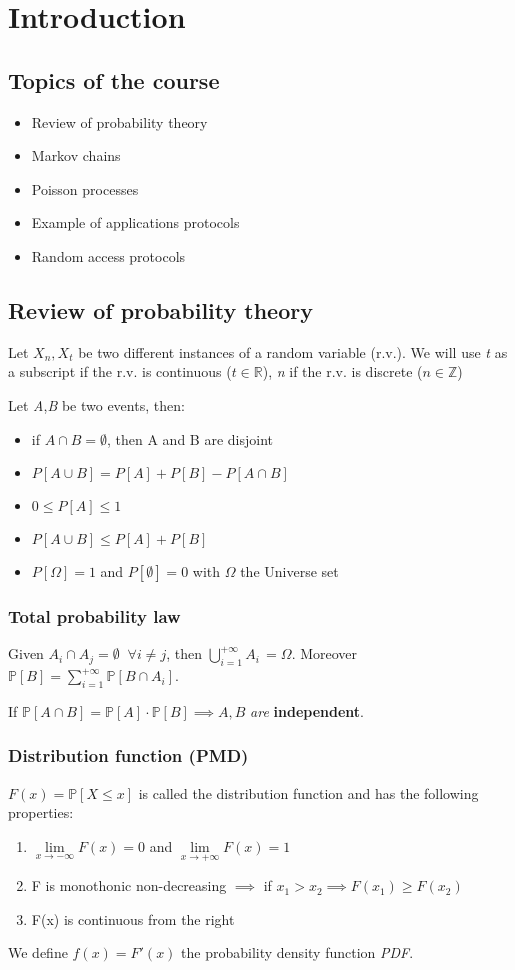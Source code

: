 \chapter{Introduction}
\section{Topics of the course}
\begin{itemize}
  \item Review of probability theory
  \item Markov chains
  \item Poisson processes
  \item Example of applications protocols
  \item Random access protocols
\end{itemize}
\section{Review of probability theory}
Let $X_n, X_t$ be two different instances of a random variable (r.v.). We will use
\textit{t} as a subscript if the r.v. is continuous ($t \in \mathbb{R}$), \textit{n} if the r.v. is discrete ($ n \in \mathbb{Z}$)

Let \textit{A},\textit{B} be two events, then:
\begin{itemize}
  \item if $A \cap B = \emptyset$, then A and B are disjoint
  \item $P[A \cup B] = P[A]+P[B] - P[A \cap B]$
  \item $0\le P[A] \le 1$
  \item $P[A \cup B] \le P[A]+P[B]$
  \item $ P[\Omega]=1 $ and $P[\emptyset]=0$ with $\Omega$ the Universe set
\end{itemize}
\subsection{Total probability law}
Given $A_i \cap A_j = \emptyset \;\; \forall i \neq j $, then $\bigcup\limits_{i=1}^{+\infty} A_i \, = \Omega$.
Moreover $\mathbb{P}[B]=\sum\limits_{i=1}^{+\infty} \mathbb{P}[B \cap A_i]$.

If $\mathbb{P}[A \cap B] = \mathbb{P}[A]\cdot \mathbb{P}[B] \implies A,B$ \textit{are} \textbf{independent}.

\subsection{Distribution function (PMD)}\label{sec:pmd}
$F(x) = \mathbb{P}[X \le x]$ is called the distribution function and has the following properties:
\begin{enumerate}
  \item $\lim\limits_{x \to -\infty} F(x) = 0$ \quad and \quad $\lim\limits_{x \to +\infty} F(x) = 1$
  \item F is monothonic non-decreasing $\implies$ if $x_1 > x_2 \implies F(x_1)\ge F(x_2)$
  \item F(x) is continuous from the right
\end{enumerate}
We define $f(x)=F'(x)$ the probability density function \textit{PDF}.

